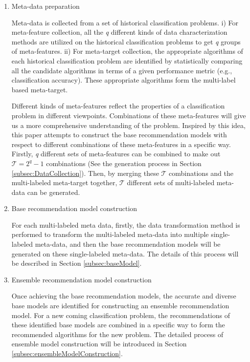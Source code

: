 \documentclass[prodmode,acmtkdd]{acmsmall}
\begin{document}
\begin{enumerate}[1)]
    \item Meta-data preparation

    Meta-data is collected from a set of historical classification problems.
    i) For meta-feature collection, all the \emph{q} different kinds of data
    characterization methods are utilized on the historical classification problems to get \emph{q} groups of
    meta-features. ii) For meta-target collection, the
    appropriate algorithms of each historical classification problem are identified
    by statistically comparing all the candidate
    algorithms in terms of a given performance metric (e.g., classification accuracy).
    These appropriate algorithms form the multi-label based meta-target.

    \quad  Different kinds of meta-features reflect the properties of a
    classification problem in different viewpoints. Combinations of these
    meta-features will give us a more comprehensive understanding
    of the problem. Inspired by this idea, this paper attempts to
    construct the base recommendation models with respect to
    different combinations of these meta-features in a specific way. Firstly, \emph{q} different
    sets of meta-features can be combined to make out $\mathcal{T} = 2^q - 1$
    combinations (See the generation process in Section \ref{subsec:DataCollection}). Then, by merging these $\mathcal{T}$ combinations and
    the multi-labeled meta-target together, $\mathcal{T}$ different sets of multi-labeled meta-data can be
    generated.

    \item Base recommendation model construction

    For each multi-labeled meta data, firstly, the data transformation
    method is performed to transform the multi-labeled
    meta-data into multiple single-labeled meta-data, and then the
    base recommendation models will be generated on these
    single-labeled meta-data. The details of this process will be described in Section
    \ref{subsec:baseModel}.

    \item Ensemble recommendation model construction

    Once achieving the base recommendation models, the accurate and
    diverse base models are identified for constructing an ensemble
    recommendation model.
    For a new coming classification problem, the recommendations of
    these identified base models are combined in a specific way to form the
    recommended algorithms for the new problem. The detailed
    process of ensemble model construction will be introduced in
    Section \ref{subsec:ensembleModelConstruction}.
\end{enumerate}
\end{document}
